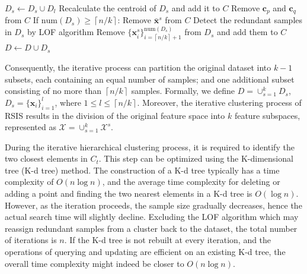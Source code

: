 \documentclass[final,3p,times]{elsarticle}
\begin{document}
\begin{algorithm}
\begin{algorithmic}
  \STATE \hspace{1.5cm}$D_s \leftarrow D_s  {\cup}  D_l$
  \STATE \hspace{1.5cm}Recalculate the centroid of $D_s$ and add it to $C$
  \STATE \hspace{1.5cm}Remove $\boldsymbol{c}_p$ and $\boldsymbol{c}_q$ from $C$
  \STATE \hspace{0.5cm}If $\text{num}(D_s)\ge \left\lceil n/k\right\rceil$:
  \STATE \hspace{1.0cm}Remove $\bar{\boldsymbol{x}}^s$ from $C$
  \STATE \hspace{1.0cm}Detect the redundant samples in $D_s$ by LOF algorithm
  \STATE \hspace{1.0cm}Remove $\{\boldsymbol{x}^s_i\}_{i=\left\lceil n/k\right\rceil+1}^{\text{num}(D_s)}$ from $D_s$ and add them to $C$
  \STATE \hspace{1.0cm}$D \leftarrow D  {\cup}  D_s$
  \end{algorithmic}
  \label{Alg1}
\end{algorithm}

Consequently, the iterative process can partition the original 
dataset into $k-1$ subsets, each containing an equal number 
of samples; and one additional subset consisting of no more 
than $\left\lceil n/k\right\rceil$ samples. Formally, we 
define $D={\cup}^k_{s=1}D_s$, $D_s=\{\boldsymbol{x}_i\}_{i=1}^l$, 
where $1 {\le} l {\le} \left\lceil n/k\right\rceil$. Moreover, the 
iterative clustering process of RSIS results in the division of 
the original feature space into $k$ feature subspaces, represented 
as $\mathcal{X} = \cup_{s=1}^{k} \mathcal{X}^s$.

During the iterative hierarchical clustering process, it is 
required to identify the two closest elements in $C_t$. This step 
can be optimized using the K-dimensional tree (K-d tree) method. 
The construction of a K-d tree typically has a time complexity 
of $O(n\log{n})$, and the average time complexity for deleting or 
adding a point and finding the two nearest elements in a K-d 
tree is $O(\log{n})$. However, as the iteration proceeds, the 
sample size gradually decreases, hence the actual search time 
will slightly decline. Excluding the LOF algorithm which may 
reassign redundant samples from a cluster back to the dataset, 
the total number of iterations is $n$. If the K-d tree is not 
rebuilt at every iteration, and the operations of querying and 
updating are efficient on an existing K-d tree, the overall 
time complexity might indeed be closer to $O(n\log{n})$.
\end{document}
